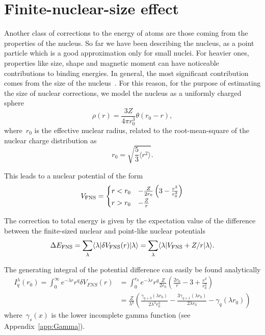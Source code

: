 \section{Finite-nuclear-size effect}

Another class of corrections to the energy of atoms are those coming from the properties of the nucleus. So far we have been describing the nucleus, as a point particle which is a good approximation only for small nuclei. For heavier ones, properties like size, shape and magnetic moment can have noticeable contributions to binding energies. In general, the most significant contribution comes from the size of the nucleus~\cite{Valuev_2020}. For this reason, for the purpose of estimating the size of nuclear corrections, we model the nucleus as a uniformly charged sphere
\begin{equation}
\rho(r) = \frac{3 Z}{4 \pi r_0^3}\theta(r_0-r),
\end{equation}
where~$r_0$ is the effective nuclear radius, related to the root-mean-square of the nuclear charge distribution as
\begin{equation}
r_0 = \sqrt{\frac{5}{3}\langle r^2\rangle}.
\end{equation}

This leads to a nuclear potential of the form
\begin{equation} \label{NucCharge}
 V_{\rm{FNS}} =
    \begin{cases}
      r<r_0 & -\frac{Z}{2 r_0}\left(3-\frac{r^2}{r_0^2}\right)\\
      r>r_0 & -\frac{Z}{r}\\
    \end{cases}       
\end{equation}

The correction to total energy is given by the expectation value of the difference between the finite-sized nuclear and point-like nuclear potentials
\begin{equation}
\Delta E_{\rm{FNS}} = \sum_\lambda \langle \lambda | \delta V_{\rm{FNS}}(r)|\lambda \rangle =\sum_\lambda \langle \lambda | V_{\rm{FNS}} + Z/r |\lambda \rangle. %
\end{equation}

The generating integral of the potential difference can easily be found analytically
\begin{align}
I_q^\lambda (r_0) = \int_0^{\infty} e^{-\lambda r} r^q \delta V_{FNS}(r) &= \int_0^{r_0} e^{-\lambda r} r^q \frac{Z}{2 r_0}\left(\frac{2 r_0}{r}-3+\frac{r^2}{r_0^2}\right) \nonumber
\\
&= \frac{Z}{\lambda^q} \left( \frac{\gamma_{q+3}(\lambda r_0)}{2\lambda^3r_0^3}-\frac{3\gamma_{q+1}(\lambda r_0)}{2\lambda r_0}-\gamma_{q}(\lambda r_0)\right)
\end{align}
where~$\gamma_s(x)$ is the lower incomplete gamma function (see Appendix~\ref{app:Gamma}).

